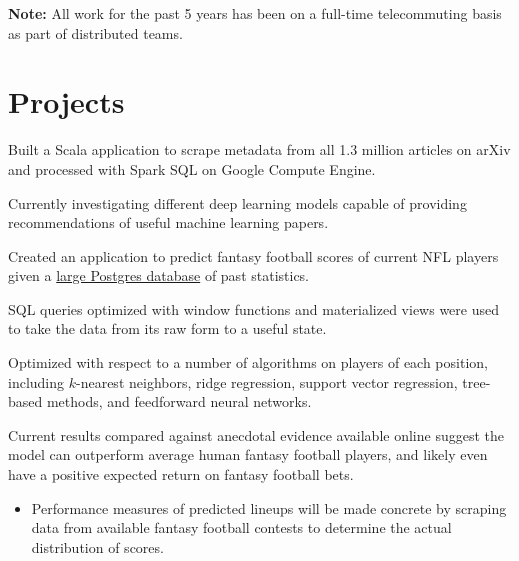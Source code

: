 \documentclass[]{deedy-resume-openfont}
\begin{document}
\begin{minipage}[t]{0.66\textwidth}
\textbf{Note:} All work for the past 5 years has been on a full-time telecommuting basis as part of distributed teams.
\section{Projects}
\begin{tightemize}
\item Built a Scala application to scrape metadata from all 1.3 million articles on arXiv and processed with Spark SQL on Google Compute Engine.
\item Currently investigating different deep learning models capable of providing recommendations of useful machine learning papers.
\end{tightemize}
\begin{tightemize} 
\item Created an application to predict fantasy football scores of current NFL players given a \href{https://github.com/BurntSushi/nfldb}{large Postgres database} of past statistics.
\item SQL queries optimized with window functions and materialized views were used to take the data from its raw form to a useful state.
\item Optimized with respect to a number of algorithms on players of each position, including $k$-nearest neighbors, ridge regression, support vector regression, tree-based methods, and feedforward neural networks.
\item Current results compared against anecdotal evidence available online suggest the model can outperform average human fantasy football players, and likely even have a positive expected return on fantasy football bets.
  \begin{itemize}
  \item Performance measures of predicted lineups will be made concrete by scraping data from available fantasy football contests to determine the actual distribution of scores.
  \end{itemize}
\end{tightemize}


\end{minipage}
\end{document}
